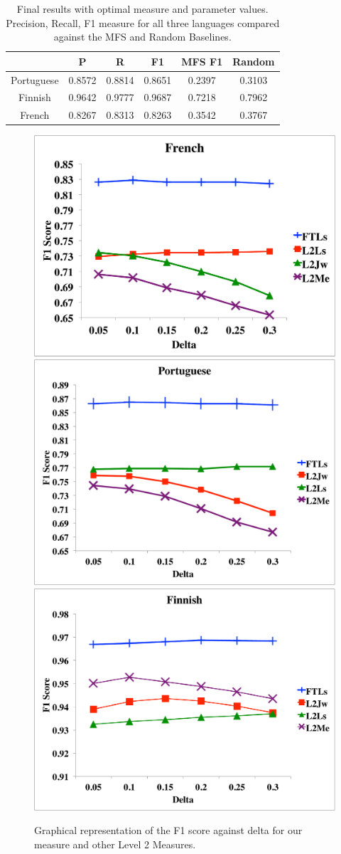 \documentclass[10pt,a4paper,twoside]{article}
\begin{document}
\begin{table}
{\centering \footnotesize
\begin{tabular}{|c|c|c|c|c|c|}
\hline &P&R&F1&MFS F1&Random\\
\hline Portuguese&0.8572&0.8814&0.8651&0.2397&0.3103\\
\hline Finnish&0.9642&0.9777&0.9687&0.7218&0.7962\\
\hline French&0.8267&0.8313&0.8263&0.3542&0.3767\\
\hline 
\end{tabular}
\caption{Final results with optimal measure and parameter values. Precision, Recall, F1 measure for all three languages compared against the MFS and Random Baselines.}
\label{tab:final}
}
\end{table} 

\begin{figure}
\centering
\includegraphics[width=.65\columnwidth]{french}
\includegraphics[width=.65\columnwidth]{portuguese}
\includegraphics[width=.65\columnwidth]{finnish}
\caption{Graphical representation of the F1 score against delta for our measure and other Level 2 Measures.}
\label{fig.2}
\end{figure}
\end{document}
